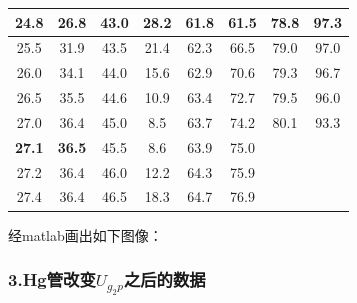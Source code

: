 \documentclass[12pt,a4paper,UTF8]{ctexart}
\begin{document}
\begin{table}[htbp]
{\begin{tabular}{|c|c||c|c||c|c||c|c|}
\hline
     24.8  &      26.8  &      43.0  &      28.2  &      61.8  &      61.5  &\textbf{78.8}  &\textbf{97.3}  \\
\hline
     25.5  &      31.9  &      43.5  &      21.4  &      62.3  &      66.5  &      79.0  &      97.0  \\
\hline
     26.0  &      34.1  &      44.0  &      15.6  &      62.9  &      70.6  &      79.3  &      96.7  \\
\hline
     26.5  &      35.5  &      44.6  &      10.9  &      63.4  &      72.7  &      79.5  &      96.0  \\
\hline
     27.0  &      36.4  &      45.0  &       8.5  &      63.7  &      74.2  &      80.1  &      93.3  \\
\hline
     \textbf{27.1}  &      \textbf{36.5}  &      45.5  &       8.6  &      63.9  &      75.0  &            &            \\
\hline
     27.2  &      36.4  &      46.0  &      12.2  &      64.3  &      75.9  &            &            \\
\hline
     27.4  &      36.4  &      46.5  &      18.3  &      64.7  &      76.9  &            &            \\
\hline
\end{tabular}  }
\end{table}
\newpage
经matlab画出如下图像：
\begin{figure}[htb]
\end{figure}
\subsubsection*{3.Hg管改变$U_{g_2p}$之后的数据}	
\end{document}
